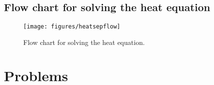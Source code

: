 \documentclass[10pt,driverfallback=hypertex]{report}
\begin{document}
\newpage
\subsection{Flow chart for solving the heat equation}

\vspace{0.5in}
\begin{figure}[h]
  \centering
  \texttt{[image: figures/heatsepflow]}
  \caption{Flow chart for solving the heat equation.}
  \label{fig:heatsepflow}
\end{figure}

\newpage
\section{Problems}
\end{document}
